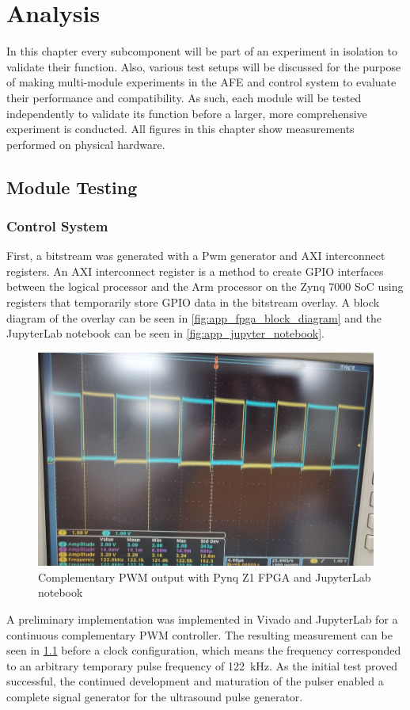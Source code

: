 \chapter{Analysis} \label{cha:Analysis} \glsresetall
In this chapter every subcomponent will be part of an experiment in isolation to validate their function. Also, various test setups will be discussed for the purpose of making multi-module experiments in the AFE and control system to evaluate their performance and compatibility. As such, each module will be tested independently to validate its function before a larger, more comprehensive experiment is conducted. All figures in this chapter show measurements performed on physical hardware.

\section{Module Testing}
\subsection{Control System}
First, a bitstream was generated with a Pwm generator and AXI interconnect registers. An AXI interconnect register is a method to create GPIO interfaces between the logical processor and the Arm processor on the Zynq 7000 SoC using registers that temporarily store GPIO data in the bitstream overlay. A block diagram of the overlay can be seen in \cref{fig:app_fpga_block_diagram} and the JupyterLab notebook can be seen in \cref{fig:app_jupyter_notebook}.

\begin{figure}[htbp]
	\centering
	\includegraphics[width=.8\textwidth]{Figures/4_controlsystem_fpga_pwm.png}
	\caption{Complementary PWM output with Pynq Z1 FPGA and JupyterLab notebook}
	\label{fig:4_controlsystem_fpga_pwm}
\end{figure}
A preliminary implementation was implemented in Vivado and JupyterLab for a continuous complementary PWM controller. The resulting measurement can be seen in \cref{fig:4_controlsystem_fpga_pwm} before a clock configuration, which means the frequency corresponded to an arbitrary temporary pulse frequency of \qty{122}{\kilo\hertz}. As the initial test proved successful, the continued development and maturation of the pulser enabled a complete signal generator for the ultrasound pulse generator.

